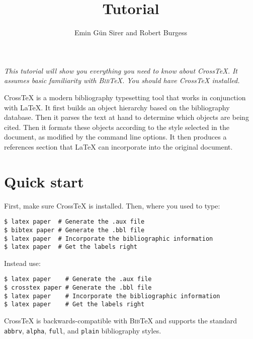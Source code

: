 \documentclass{article}
\title{\XTeX{} Tutorial}
\author{Emin G\"un Sirer and Robert Burgess}
\date{}
\newcommand{\XTeX}{Cross\TeX}
\newcommand{\BibTeX}{\textsc{Bib}\TeX}
\begin{document}
\maketitle

\textit{
This tutorial will show you everything you need to know about \XTeX{}. It assumes basic familiarity with \BibTeX{}. You should have \XTeX{} installed.
}

\XTeX{} is a modern bibliography typesetting tool that works in conjunction with \LaTeX{}. It first builds an object hierarchy based on the bibliography database. Then it parses the text at hand to determine which objects are being cited. Then it formats these objects according to the style selected in the document, as modified by the command line options. It then produces a references section that \LaTeX{} can incorporate into the original document.



\section{Quick start}

First, make sure \XTeX{} is installed. Then, where you used to type:

\begin{small}\begin{verbatim}
$ latex paper  # Generate the .aux file
$ bibtex paper # Generate the .bbl file
$ latex paper  # Incorporate the bibliographic information
$ latex paper  # Get the labels right
\end{verbatim}\end{small}

Instead use:

\begin{small}\begin{verbatim}
$ latex paper    # Generate the .aux file
$ crosstex paper # Generate the .bbl file
$ latex paper    # Incorporate the bibliographic information
$ latex paper    # Get the labels right
\end{verbatim}\end{small}

\XTeX{} is backwards-compatible with \BibTeX{} and supports the standard \texttt{abbrv}, \texttt{alpha}, \texttt{full}, and \texttt{plain} bibliography styles.
\end{document}
